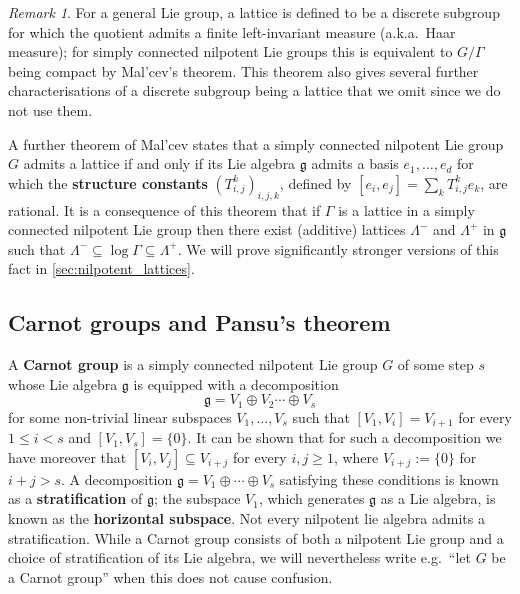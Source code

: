 \documentclass[11pt]{article}
\numberwithin{equation}{section}
\theoremstyle{plain}
\theoremstyle{definition}
\theoremstyle{remark}
\newtheorem{remark}{Remark}[section]
\numberwithin{equation}{section}
\numberwithin{equation}{section}
\begin{document}
\begin{remark}
For a general Lie group, a lattice is defined to be a discrete subgroup for which the quotient admits a finite left-invariant measure (a.k.a.\ Haar measure); for simply connected nilpotent Lie groups this is equivalent to $G/\Gamma$ being compact by Mal'cev's theorem.
This theorem also gives several further characterisations of a discrete subgroup being a lattice that we omit since we do not use them.
\end{remark}



A further theorem of Mal'cev \cite[Theorem 2.12]{raghunathan1972discrete} states that a simply connected nilpotent Lie group $G$ admits a lattice if and only if its Lie algebra $\mathfrak{g}$ admits a basis $e_1,\ldots,e_d$ for which the \textbf{structure constants} $(T_{i,j}^k)_{i,j,k}$, defined by $[e_i,e_j]=\sum_k T_{i,j}^k e_k$,  are rational. It is a consequence of this theorem \cite[Proposition 2.3.7]{Wang2023} that if $\Gamma$ is a lattice in a simply connected nilpotent Lie group then there exist (additive) lattices $\Lambda^-$ and $\Lambda^+$ in $\mathfrak{g}$ such that $\Lambda^- \subseteq \log \Gamma \subseteq \Lambda^+$. We will prove significantly stronger versions of this fact in \cref{sec:nilpotent_lattices}.
%




\subsection{Carnot groups and Pansu's theorem}
\label{subsec:Carnot_background}

A \textbf{Carnot group} is a simply connected nilpotent Lie group $G$ of some step $s$ whose Lie algebra $\mathfrak{g}$ is equipped with a decomposition
\[
\mathfrak{g}=V_1 \oplus V_2 \cdots \oplus V_s
\]
for some non-trivial linear subspaces $V_1,\ldots,V_s$ such that $[V_1,V_i]=V_{i+1}$ for every $1\leq i <s$ and $[V_1,V_s]=\{0\}$. 
It can be shown that
for such a decomposition we have moreover that $[V_i,V_j]\subseteq V_{i+j}$ for every $i,j \geq 1$, where $V_{i+j}:=\{0\}$ for $i+j>s$. A decomposition $\mathfrak{g}=V_1\oplus \cdots \oplus V_s$ satisfying these conditions is known as a \textbf{stratification} of $\mathfrak{g}$; the subspace $V_1$, which generates $\mathfrak{g}$ as a Lie algebra, is known as the \textbf{horizontal subspace}. Not every nilpotent lie algebra admits a stratification. While a Carnot group consists of both a nilpotent Lie group and a choice of stratification of its Lie algebra, we will nevertheless write e.g.\ ``let $G$ be a Carnot group'' when this does not cause confusion.
\end{document}
